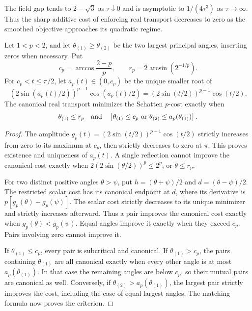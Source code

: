 The field gap tends to $2-\sqrt3$ as $\tau\downarrow0$ and is
asymptotic to $1/(4\tau^3)$ as $\tau\to\infty$. Thus the sharp
additive cost of enforcing real transport decreases to zero as the
smoothed objective approaches its quadratic regime.

\begin{corollary}
\label{cor:real-schatten-canonical-top-two}
Let $1<p<2$, and let $\theta_{(1)}\geq\theta_{(2)}$ be the two largest
principal angles, inserting zeros when necessary. Put
\[
 c_p=\arccos\frac{2-p}{p},\qquad
 r_p=2\arcsin(2^{-1/p}).
\]
For $c_p<t\leq\pi/2$, let $a_p(t)\in(0,c_p)$ be the unique smaller
root of
\[
 (2\sin(a_p(t)/2))^{p-1}\cos(a_p(t)/2)
       =(2\sin(t/2))^{p-1}\cos(t/2).
\]
The canonical real transport minimizes the Schatten $p$-cost exactly when
\[
 \theta_{(1)}\leq r_p
 \quad\hbox{and}\quad
 \left[\theta_{(1)}\leq c_p
       \ \hbox{or}\ \theta_{(2)}\leq a_p(\theta_{(1)})\right].
\]
\end{corollary}

\begin{proof}
The amplitude $g_p(t)=(2\sin(t/2))^{p-1}\cos(t/2)$ strictly
increases from zero to its maximum at $c_p$, then strictly decreases
to zero at $\pi$. This proves existence and uniqueness of $a_p(t)$.
A single reflection cannot improve the canonical cost exactly when
$2(2\sin(\theta/2))^p\leq2^p$, or $\theta\leq r_p$.

For two distinct positive angles $\theta>\psi$, put
$h=(\theta+\psi)/2$ and $d=(\theta-\psi)/2$.
The restricted scalar cost has its canonical endpoint at $d$, where
its derivative is $p[g_p(\theta)-g_p(\psi)]$.
The scalar cost strictly decreases to its unique minimizer and strictly
increases afterward. Thus a pair improves the canonical cost exactly
when $g_p(\theta)<g_p(\psi)$.
Equal angles improve it exactly when they exceed $c_p$.
Pairs involving zero cannot improve it.

If $\theta_{(1)}\leq c_p$, every pair is subcritical and canonical.
If $\theta_{(1)}>c_p$, the pairs containing $\theta_{(1)}$ are all
canonical exactly when every other angle is at most
$a_p(\theta_{(1)})$. In that case the remaining angles are below
$c_p$, so their mutual pairs are canonical as well. Conversely, if
$\theta_{(2)}>a_p(\theta_{(1)})$, the largest pair strictly improves
the cost, including the case of equal largest angles. The matching
formula now proves the criterion.
\end{proof}

